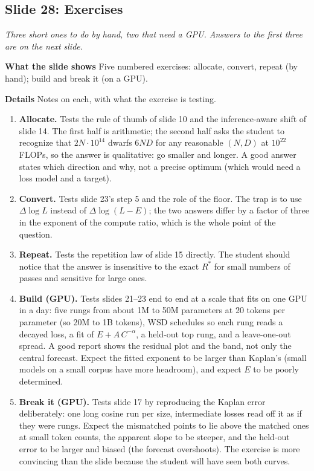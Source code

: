 \documentclass[11pt,letterpaper]{article}
\newcommand{\slide}[3]{%
  \subsection[Slide #1: #2]{Slide #1: #2}%
  {\color{muted}\itshape #3\par}\medskip}
\newcommand{\para}[1]{\medskip\noindent\textbf{#1}\quad}
\begin{document}
\slide{28}{Exercises}{Three short ones to do by hand, two that need a GPU. Answers to the first three are on the next slide.}

\para{What the slide shows} Five numbered exercises: allocate, convert, repeat (by hand); build and break it (on a GPU).

\para{Details} Notes on each, with what the exercise is testing.
\begin{enumerate}
\item \textbf{Allocate.} Tests the rule of thumb of slide 10 and the inference-aware shift of slide 14. The first half is arithmetic; the second half asks the student to recognize that $2N\cdot10^{14}$ dwarfs $6ND$ for any reasonable $(N,D)$ at $10^{22}$ FLOPs, so the answer is qualitative: go smaller and longer. A good answer states which direction and why, not a precise optimum (which would need a loss model and a target).
\item \textbf{Convert.} Tests slide 23's step 5 and the role of the floor. The trap is to use $\Delta\log L$ instead of $\Delta\log(L-E)$; the two answers differ by a factor of three in the exponent of the compute ratio, which is the whole point of the question.
\item \textbf{Repeat.} Tests the repetition law of slide 15 directly. The student should notice that the answer is insensitive to the exact $R^*$ for small numbers of passes and sensitive for large ones.
\item \textbf{Build (GPU).} Tests slides 21--23 end to end at a scale that fits on one GPU in a day: five rungs from about 1M to 50M parameters at 20 tokens per parameter (so 20M to 1B tokens), WSD schedules so each rung reads a decayed loss, a fit of $E+A\,C^{-\alpha}$, a held-out top rung, and a leave-one-out spread. A good report shows the residual plot and the band, not only the central forecast. Expect the fitted exponent to be larger than Kaplan's (small models on a small corpus have more headroom), and expect $E$ to be poorly determined.
\item \textbf{Break it (GPU).} Tests slide 17 by reproducing the Kaplan error deliberately: one long cosine run per size, intermediate losses read off it as if they were rungs. Expect the mismatched points to lie above the matched ones at small token counts, the apparent slope to be steeper, and the held-out error to be larger and biased (the forecast overshoots). The exercise is more convincing than the slide because the student will have seen both curves.
\end{enumerate}
\end{document}
